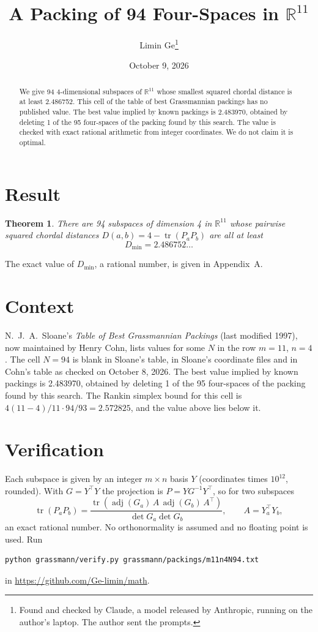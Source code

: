 \documentclass[11pt,a4paper]{article}
\title{A Packing of 94 Four-Spaces in $\mathbb{R}^{11}$}
\author{Limin Ge\thanks{Found and checked by Claude, a model released by Anthropic, running on the author's laptop. The author sent the prompts.}}
\date{October 9, 2026}
\newtheorem*{theorem}{Theorem}
\begin{document}
\maketitle
\begin{abstract}
We give 94 4-dimensional subspaces of $\mathbb{R}^{11}$ whose smallest squared chordal distance is at least 2.486752. This cell of the table of best Grassmannian packings has no published value. The best value implied by known packings is 2.483970, obtained by deleting 1 of the 95 four-spaces of the packing found by this search. The value is checked with exact rational arithmetic from integer coordinates. We do not claim it is optimal.
\end{abstract}

\section{Result}
\begin{theorem}
There are 94 subspaces of dimension 4 in $\mathbb{R}^{11}$ whose pairwise squared chordal distances $D(a,b) = 4 - \operatorname{tr}(P_aP_b)$ are all at least
\[ D_{\min} = 2.486752\ldots \]
\end{theorem}
The exact value of $D_{\min}$, a rational number, is given in Appendix~A.


\section{Context}
N.~J.~A.~Sloane's \emph{Table of Best Grassmannian Packings} (last modified 1997), now maintained by Henry Cohn, lists values for some $N$ in the row $m=11$, $n=4$. The cell $N=94$ is blank in Sloane's table, in Sloane's coordinate files and in Cohn's table as checked on October 8, 2026. The best value implied by known packings is 2.483970, obtained by deleting 1 of the 95 four-spaces of the packing found by this search. The Rankin simplex bound for this cell is $4(11-4)/11\cdot 94/93 = 2.572825$, and the value above lies below it.


\section{Verification}
Each subspace is given by an integer $m\times n$ basis $Y$ (coordinates times $10^{12}$, rounded). With $G=Y^\top Y$ the projection is $P=YG^{-1}Y^\top$, so for two subspaces
\[ \operatorname{tr}(P_aP_b)=\frac{\operatorname{tr}(\operatorname{adj}(G_a)\,A\,\operatorname{adj}(G_b)\,A^\top)}{\det G_a\det G_b},\qquad A=Y_a^\top Y_b, \]
an exact rational number. No orthonormality is assumed and no floating point is used. Run
\begin{verbatim}
python grassmann/verify.py grassmann/packings/m11n4N94.txt
\end{verbatim}
in \url{https://github.com/Ge-limin/math}.
\end{document}
